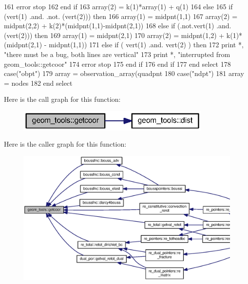 \begin{DoxyCode}
161                 error stop
162 \textcolor{keywordflow}{              end if}
163               array(2) = k(1)*array(1) + q(1)
164             \textcolor{keywordflow}{else}
165               \textcolor{keywordflow}{if} (vert(1) .and. .not. (vert(2))) \textcolor{keywordflow}{then}
166                 array(1) = midpnt(1,1)
167                 array(2) = midpnt(2,2) + k(2)*(midpnt(1,1)-midpnt(2,1))
168               \textcolor{keywordflow}{else} \textcolor{keywordflow}{if} (.not.vert(1) .and. (vert(2))) \textcolor{keywordflow}{then}
169                 array(1) = midpnt(2,1)
170                 array(2) = midpnt(1,2) + k(1)*(midpnt(2,1) - midpnt(1,1))
171               \textcolor{keywordflow}{else} \textcolor{keywordflow}{if} ( vert(1) .and. vert(2) ) \textcolor{keywordflow}{then}
172                 print *, \textcolor{stringliteral}{"there must be a bug, both lines are vertical"}
173                 print *, \textcolor{stringliteral}{"interrupted from geom\_tools::getcoor"}
174                 error stop
175 \textcolor{keywordflow}{              end if}
176 \textcolor{keywordflow}{            end if}   
177 \textcolor{keywordflow}{        end select}
178       \textcolor{keywordflow}{case}(\textcolor{stringliteral}{"obpt"})
179         array = observation_array(quadpnt%
180       \textcolor{keywordflow}{case}(\textcolor{stringliteral}{"ndpt"})
181         array = nodes%
182 \textcolor{keywordflow}{    end select}
\end{DoxyCode}


Here is the call graph for this function\+:\nopagebreak
\begin{figure}[H]
\begin{center}
\leavevmode
\includegraphics[width=274pt]{namespacegeom__tools_a4c2336f6e1e7d512a9d81acb21c71456_cgraph}
\end{center}
\end{figure}




Here is the caller graph for this function\+:\nopagebreak
\begin{figure}[H]
\begin{center}
\leavevmode
\includegraphics[width=350pt]{namespacegeom__tools_a4c2336f6e1e7d512a9d81acb21c71456_icgraph}
\end{center}
\end{figure}


